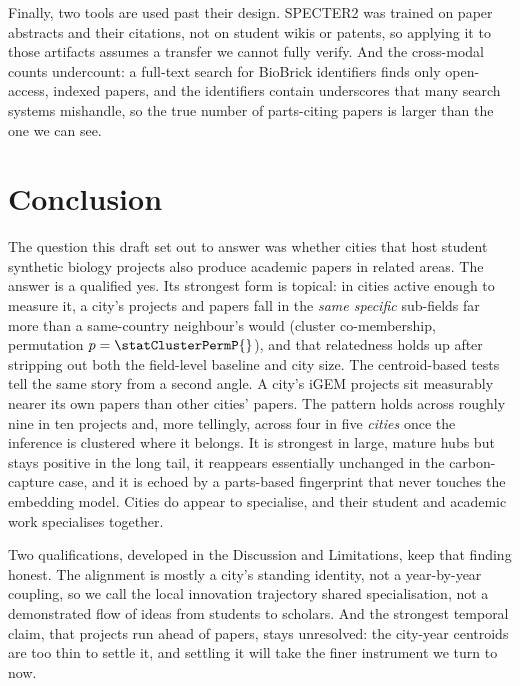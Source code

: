 \documentclass[12pt,a4paper]{article}
\begin{document}
	Finally, two tools are used past their design. SPECTER2 was trained on paper
	abstracts and their citations, not on student wikis or patents, so applying it to
	those artifacts assumes a transfer we cannot fully verify. And the cross-modal
	counts undercount: a full-text search for BioBrick identifiers finds only
	open-access, indexed papers, and the identifiers contain underscores that many
	search systems mishandle, so the true number of parts-citing papers is larger than
	the one we can see.
	
	\section{Conclusion}
	
	The question this draft set out to answer was whether cities that host student
	synthetic biology projects also produce academic papers in related areas. The
	answer is a qualified yes. Its strongest form is topical: in cities active enough to
	measure it, a city's projects and papers fall in the \textit{same specific}
	sub-fields far more than a same-country neighbour's would (cluster co-membership,
	permutation $p = \statClusterPermP{}$), and that relatedness holds up after
	stripping out both the field-level baseline and city size. The centroid-based tests
	tell the same story from a second angle. A city's iGEM projects sit measurably
	nearer its own papers than other cities' papers. The pattern holds across roughly
	nine in ten projects and, more tellingly, across four in five \textit{cities} once
	the inference is clustered where it belongs. It is strongest in large, mature hubs
	but stays positive in the long tail, it reappears essentially unchanged in the
	carbon-capture case, and it is echoed by a parts-based fingerprint that never
	touches the embedding model. Cities do appear to specialise, and their student and
	academic work specialises together.
	
	Two qualifications, developed in the Discussion and Limitations, keep that finding
	honest. The alignment is mostly a city's standing identity, not a year-by-year
	coupling, so we call the local innovation trajectory shared specialisation, not a
	demonstrated flow of ideas from students to scholars. And the strongest temporal
	claim, that projects run ahead of papers, stays unresolved: the city-year centroids
	are too thin to settle it, and settling it will take the finer instrument we turn
	to now.
	
\end{document}
